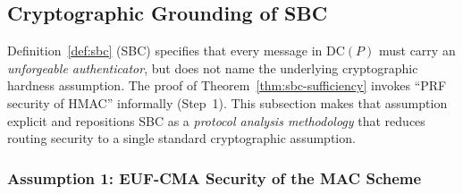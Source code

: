 
\subsection{Cryptographic Grounding of SBC}
\label{subsec:sbc-crypto}

Definition~\ref{def:sbc} (SBC) specifies that every message in
$\mathrm{DC}(P)$ must carry an \emph{unforgeable authenticator}, but
does not name the underlying cryptographic hardness assumption.
The proof of Theorem~\ref{thm:sbc-sufficiency} invokes ``PRF security
of HMAC'' informally (Step~1).  This subsection makes that assumption
explicit and repositions SBC as a \emph{protocol analysis methodology}
that reduces routing security to a single standard cryptographic
assumption.

\subsubsection*{Assumption 1: EUF-CMA Security of the MAC Scheme}

